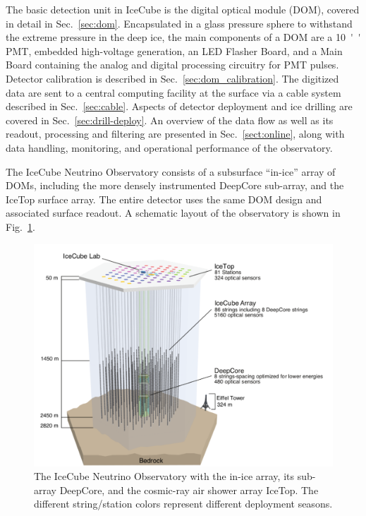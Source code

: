 The basic detection unit in IceCube is the
digital optical module (DOM), covered in detail in Sec.~\ref{sec:dom}.
Encapsulated in a glass pressure sphere 
to withstand the extreme pressure in the deep ice, the main components of a DOM
are a \SI{10}{''} PMT, embedded high-voltage generation, an LED Flasher 
Board, and a Main Board containing the analog and digital processing circuitry
for PMT pulses.  Detector calibration
is described in Sec.~\ref{sec:dom_calibration}. The digitized data are sent to a
central computing facility at the surface via a cable system described in
Sec.~\ref{sec:cable}.  Aspects of detector deployment and ice drilling are
covered in Sec.~\ref{sec:drill-deploy}. An overview of the data flow as well as
its readout, processing and filtering are presented in
Sec.~\ref{sect:online}, along with data handling, monitoring, and operational performance of
the observatory.

The IceCube Neutrino Observatory consists of a subsurface
``in-ice'' array of DOMs, including the more densely instrumented
DeepCore sub-array, and the IceTop surface array.  The entire detector
uses the same DOM design and associated surface readout. A schematic layout
of the observatory is shown in Fig.~\ref{fig:array}. 

\begin{figure}[!ht]
 \centering
 \includegraphics[width=\textwidth]{graphics/intro/ArrayWSeasonsLabels_crop.pdf}
 \caption{The IceCube Neutrino Observatory with the in-ice array, its sub-array DeepCore, and
   the cosmic-ray air shower array IceTop. The different string/station colors
   represent different deployment seasons.}
 \label{fig:array}
\end{figure}

